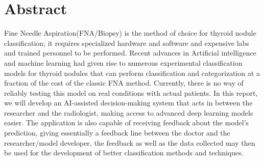 \chapter{Abstract}
\label{abstract}

Fine Needle Aspiration(FNA/Biopsy) is the method of choice for thyroid nodule classification; it requires specialized hardware and software
and expensive labs and trained personnel to be performed. Recent advances in Artificial intelligence and machine learning had given rise to numerous 
experimental classification models for thyroid nodules that can perform classification and categorization at a
fraction of the cost of the classic FNA method. Currently, there is no way of reliably testing this model on real conditions with actual patients. 
In this report, we will develop an AI-assisted decision-making system that acts in between the researcher and the radiologist, making access to advanced 
deep learning models easier. The application is also capable of receiving feedback about the
model's prediction, giving essentially a feedback line between the doctor and the researcher/model developer, the feedback as well as the data
collected may then be used for the development of better classification methods and techniques.

